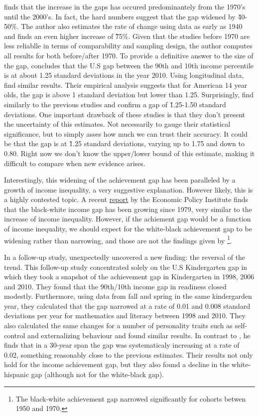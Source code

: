 \documentclass[11pt, a4paper]{article}\usepackage[]{graphicx}\usepackage[]{color}
\begin{document}
\citet{reardon2011} finds that the increase in the gaps has occured predominantely from the 1970's until the 2000's. In fact, the hard numbers suggest that the gap widened by \~  40-50\%. The author also estimates the rate of change using data as early as 1940 and finds an even higher increase of \~  75\%. Given that the studies before 1970 are less reliablle in terms of comparability and sampling design, the author computes all results for both before/after 1970. To provide a definitive answer to the size of the gap, \citet{reardon2011} concludes that the U.S gap between the 90th and 10th income percentile is at about 1.25 standard deviations in the year 2010. Using longitudinal data, \citet{bradbury2015} find similar results. Their empirical analysis suggests that for American 14 year olds, the gap is above 1 standard deviation but lower than 1.25. Surprisingly, \citet{duncan2011} find similarly to the previous studies and confirm a gap of \~ 1.25-1.50 standard deviations. One important drawback of these studies is that they don't present the uncertainty of this estimates. Not necessarily to gauge their statistical significance, but to simply asses how much we can trust their accuracy. It could be that the gap is at \~ 1.25 standard deviations, varying up to 1.75 and down to 0.80. Right now we don't know the upper/lower bound of this estimate, making it difficult to compare when new evidence arises.

Interestingly, this widening of the achievement gap has been paralleled by a growth of income inequality, a very suggestive explanation. However likely, this is a highly contested topic. A recent \href{http://www.epi.org/files/pdf/101972.pdf}{report} by the Economic Policy Institute finds that the black-white income gap has been growing since 1979, very similar to the increase of income inequality. However, if the achiement gap would be a function of income inequality, we should expect for the white-black achievement gap to be widening rather than narrowing, and those are not the findings given by \citet{reardon2011, magnuson2008}
\footnote{The black-white achievement gap narrowed significantly for cohorts betwen 1950 and 1970.}.

In a follow-up study, \citet{reardon_portilla} unexpectedly uncovered a new finding: the reversal of the trend. This follow-up study concentrated solely on the U.S Kindergarten gap in which they took a snapshot of the achievement gap in Kindergarten in 1998, 2006 and 2010. They found that the 90th/10th income gap in readiness closed modestly. Furthermore, using data from fall and spring in the same kindergarden year, they calculated that the gap narrowed at a rate of 0.01 and 0.008 standard deviations per year for mathematics and literacy between 1998 and 2010. They also calculated the same changes for a number of personality traits such as self-control and externalizing behaviour and found similar results. In contrast to \citet{reardon2011}, he finds that in a 30-year span the gap was systematicaly increasing at a rate of 0.02, something reasonably close to the previous estimates. Their results not only hold for the income achievement gap, but they also found a decline in the white-hispanic gap (although not for the white-black gap).
\end{document}
